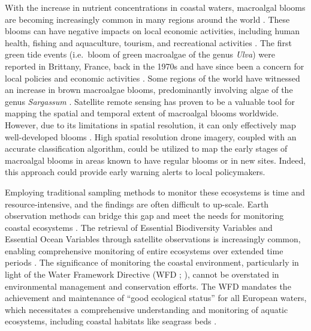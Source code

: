 \documentclass[
  number]{elsarticle}
\begin{document}
With the increase in nutrient concentrations in coastal waters,
macroalgal blooms are becoming increasingly common in many regions
around the world \citetext{\citealp[
]{sutton2011european}; \citealp{ye2011green}}. These blooms can have
negative impacts on local economic activities, including human health,
fishing and aquaculture, tourism, and recreational activities
\citetext{\citealp[ ]{villares1999nitrogen}; \citealp{ye2011green}}. The
first green tide events (i.e.~bloom of green macroalgae of the genus
\emph{Ulva}) were reported in Brittany, France, back in the 1970s and
have since been a concern for local policies and economic activities
\citep{menesguen2018marees}. Some regions of the world have witnessed an
increase in brown macroalgae blooms, predominantly involving algae of
the genus \emph{Sargassum} \citep{louime2017sargassum}. Satellite remote
sensing has proven to be a valuable tool for mapping the spatial and
temporal extent of macroalgal blooms worldwide. However, due to its
limitations in spatial resolution, it can only effectively map
well-developed blooms \citetext{\citealp[
]{rs13081408}; \citealp{klemas2012remote}}. High spatial resolution
drone imagery, coupled with an accurate classification algorithm, could
be utilized to map the early stages of macroalgal blooms in areas known
to have regular blooms or in new sites. Indeed, this approach could
provide early warning alerts to local policymakers.

Employing traditional sampling methods to monitor these ecosystems is
time and resource-intensive, and the findings are often difficult to
up-scale. Earth observation methods can bridge this gap and meet the
needs for monitoring coastal ecosystems
\citep{papathanasopoulou2019satellite}. The retrieval of Essential
Biodiversity Variables and Essential Ocean Variables through satellite
observations is increasingly common, enabling comprehensive monitoring
of entire ecosystems over extended time periods \citetext{\citealp[
]{ratnarajah2023monitoring}; \citealp{ZOFFOLI2020112020}}. The
significance of monitoring the coastal environment, particularly in
light of the Water Framework Directive (WFD ; \citep{WFD2000}), cannot
be overstated in environmental management and conservation efforts. The
WFD mandates the achievement and maintenance of ``good ecological
status'' for all European waters, which necessitates a comprehensive
understanding and monitoring of aquatic ecosystems, including coastal
habitats like seagrass beds \citetext{\citealp[
]{foden2007angiosperms}; \citealp[
]{nordlund2024one}; \citealp{Zoffoli2021}}.
\end{document}

